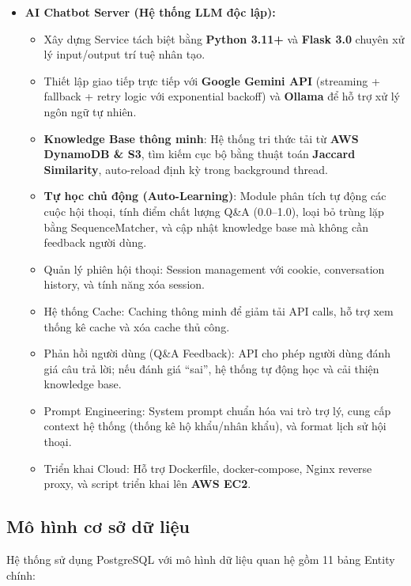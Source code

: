 \documentclass[12pt,a4paper]{article}
\begin{document}
\begin{itemize}[leftmargin=*]
    \item \textbf{AI Chatbot Server (Hệ thống LLM độc lập):} 
    \begin{itemize}
        \item Xây dựng Service tách biệt bằng \textbf{Python 3.11+} và \textbf{Flask 3.0} chuyên xử lý input/output trí tuệ nhân tạo.
        \item Thiết lập giao tiếp trực tiếp với \textbf{Google Gemini API} (streaming + fallback + retry logic với exponential backoff) và \textbf{Ollama} để hỗ trợ xử lý ngôn ngữ tự nhiên.
        \item \textbf{Knowledge Base thông minh}: Hệ thống tri thức tải từ \textbf{AWS DynamoDB \& S3}, tìm kiếm cục bộ bằng thuật toán \textbf{Jaccard Similarity}, auto-reload định kỳ trong background thread.
        \item \textbf{Tự học chủ động (Auto-Learning)}: Module phân tích tự động các cuộc hội thoại, tính điểm chất lượng Q\&A (0.0--1.0), loại bỏ trùng lặp bằng SequenceMatcher, và cập nhật knowledge base mà không cần feedback người dùng.
        \item Quản lý phiên hội thoại: Session management với cookie, conversation history, và tính năng xóa session.
        \item Hệ thống Cache: Caching thông minh để giảm tải API calls, hỗ trợ xem thống kê cache và xóa cache thủ công.
        \item Phản hồi người dùng (Q\&A Feedback): API cho phép người dùng đánh giá câu trả lời; nếu đánh giá ``sai'', hệ thống tự động học và cải thiện knowledge base.
        \item Prompt Engineering: System prompt chuẩn hóa vai trò trợ lý, cung cấp context hệ thống (thống kê hộ khẩu/nhân khẩu), và format lịch sử hội thoại.
        \item Triển khai Cloud: Hỗ trợ Dockerfile, docker-compose, Nginx reverse proxy, và script triển khai lên \textbf{AWS EC2}.
    \end{itemize}
\end{itemize}

\subsection{Mô hình cơ sở dữ liệu}
Hệ thống sử dụng PostgreSQL với mô hình dữ liệu quan hệ gồm 11 bảng Entity chính:
\end{document}
